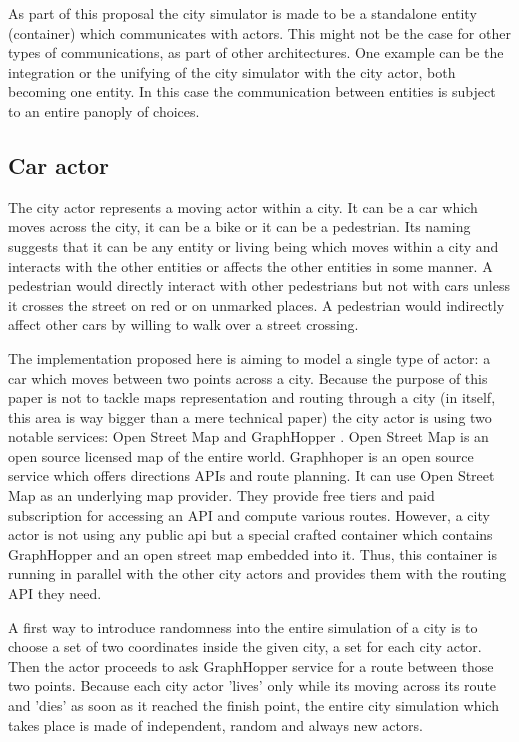 \documentclass[conference]{IEEEtran}
\begin{document}
As part of this proposal the city simulator is made to be a standalone entity (container) which communicates with actors. This might not be the case for other types of communications, as part of other architectures. One example can be the integration or the unifying of the city simulator with the city actor, both becoming one entity. In this case the communication between entities is subject to an entire panoply of choices.

\subsection{Car actor}

The city actor represents a moving actor within a city. It can be a car which moves across the city, it can be a bike or it can be a pedestrian. Its naming suggests that it can be any entity or living being which moves within a city and interacts with the other entities or affects the other entities in some manner. A pedestrian would directly interact with other pedestrians but not with cars unless it crosses the street on red or on unmarked places. A pedestrian would indirectly affect other cars by willing to walk over a street crossing.

The implementation proposed here is aiming to model a single type of actor: a car which moves between two points across a city. Because the purpose of this paper is not to tackle maps representation and routing through a city (in itself, this area is way bigger than a mere technical paper) the city actor is using two notable services: Open Street Map \cite{openstreetmap} and GraphHopper \cite{graphhopper}. Open Street Map is an open source licensed map of the entire world. Graphhoper is an open source service which offers directions APIs and route planning. It can use Open Street Map as an underlying map provider. They provide free tiers and paid subscription for accessing an API and compute various routes. However, a city actor is not using any public api but a special crafted container which contains GraphHopper and an open street map embedded into it. Thus, this container is running in parallel with the other city actors and provides them with the routing API they need.

A first way to introduce randomness into the entire simulation of a city is to choose a set of two coordinates inside the given city, a set for each city actor. Then the actor proceeds to ask GraphHopper service for a route between those two points. Because each city actor 'lives' only while its moving across its route and 'dies' as soon as it reached the finish point, the entire city simulation which takes place is made of independent, random and always new actors.
\end{document}
